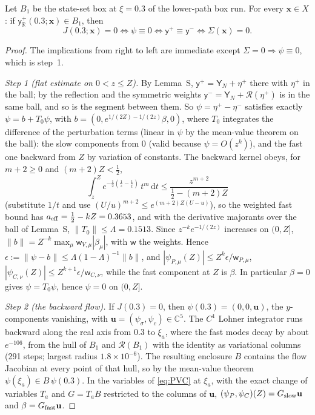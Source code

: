 \documentclass{amsart}
\numberwithin{equation}{section}
\theoremstyle{plain}
\newenvironment{lemnamed}[1]{\renewcommand\theinnerlem{#1}\innerlem}{\endinnerlem}
\theoremstyle{definition}
\theoremstyle{remark}
\newcommand{\bx}{\mathbf{x}}
\newcommand{\dd}{\mathrm{d}}
\begin{document}
\begin{lemnamed}{6a}\label{lem:6a}
Let $B_1$ be the state-set box at $\xi = 0.3$ of the lower-path box run. For every $\bx \in X$: if $\mathsf y^+_{\mathbb R}(0.3;\bx) \in B_1$,
then
\[
J(0.3;\bx) = 0 \iff \psi \equiv 0 \iff \mathsf y^+ \equiv \mathsf y^- \iff \Sigma(\bx) = 0 .
\]
\end{lemnamed}

\begin{proof}
The implications from right to left are immediate except $\Sigma = 0 \Rightarrow \psi \equiv 0$, which is step~1.

\emph{Step 1 (flat estimate on $0 < z \le Z$).} By Lemma~S, $\mathsf y^+ = \mathsf Y_N + \eta^+$ there with $\eta^+$ in the ball; by the
reflection and the symmetric weights $\mathsf y^- = \mathsf Y_N + \mathcal R(\eta^+)$ is in the same ball, and so is the segment between them.
So $\psi = \eta^+ - \eta^-$ satisfies exactly $\psi = b + T_0\psi$, with $b = (0, e^{1/(2Z) - 1/(2z)}\beta, 0)$, where $T_0$ integrates the
difference of the perturbation terms (linear in $\psi$ by the mean-value theorem on the ball): the slow components from $0$
(valid because $\psi = O(z^k)$), and the fast one backward from $Z$ by variation of constants. The backward kernel obeys, for
$m + 2 \ge 0$ and $(m+2)Z < \tfrac12$,
\[
\int_z^Z e^{-\frac12\left(\frac1z - \frac1t\right)}\,t^m\,\dd t \le \frac{z^{m+2}}{\tfrac12 - (m+2)Z}
\]
(substitute $1/t$ and use $(U/u)^{m+2} \le e^{(m+2)Z(U - u)}$), so the weighted fast bound has $a_{\rm eff} = \tfrac12 - kZ = 0.3653$,
and with the derivative majorants over the ball of Lemma~S, $\|T_0\| \le \Lambda = 0.1513$. Since $z^{-k}e^{-1/(2z)}$ increases on
$(0, Z]$, $\|b\| = Z^{-k}\max_\mu\mathsf w_{V,\mu}|\beta_\mu|$, with $\mathsf w$ the weights. Hence $\epsilon := \|\psi - b\| \le
\Lambda(1-\Lambda)^{-1}\|b\|$, and $|\psi_{P,\mu}(Z)| \le Z^k\epsilon/\mathsf w_{P,\mu}$, $|\psi_{C,\nu}(Z)| \le Z^{k+1}\epsilon/\mathsf w_{C,\nu}$, while the
fast component at $Z$ is $\beta$. In particular $\beta = 0$ gives $\psi = T_0\psi$, hence $\psi = 0$ on $(0, Z]$.

\emph{Step 2 (the backward flow).} If $J(0.3) = 0$, then $\psi(0.3) = (0, 0, \mathbf u)$, the $y$-components vanishing, with
$\mathbf u = (\psi_\sigma, \psi_c) \in \mathbb C^5$. The $C^1$ Lohner integrator runs backward along the real axis from $0.3$ to $\xi_a$, where
the fast modes decay by about $e^{-106}$, from the hull of $B_1$ and $\mathcal R(B_1)$ with the identity as variational columns
(291 steps; largest radius $1.8\times10^{-6}$). The resulting enclosure $B$ contains the flow Jacobian at every point of that hull,
so by the mean-value theorem $\psi(\xi_a) \in B\,\psi(0.3)$. In the variables of \eqref{eq:PVC} at $\xi_a$, with the exact change of
variables $T_a$ and $G = T_aB$ restricted to the columns of $\mathbf u$, $(\psi_P, \psi_C)(Z) = G_{\rm slow}\mathbf u$ and $\beta = G_{\rm fast}\mathbf u$.


\end{proof}
\end{document}

